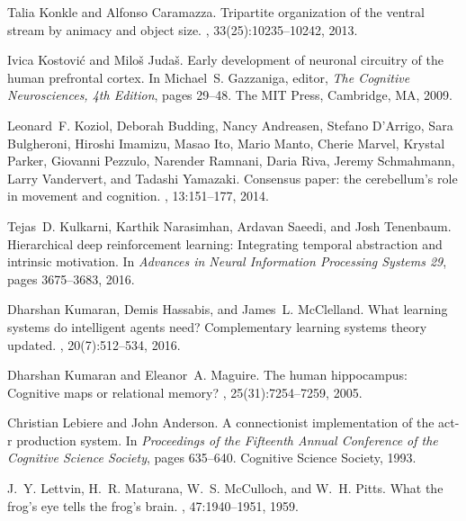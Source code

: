 \documentclass[letterpaper,11pt]{article}
\begin{document}
\begin{thebibliography}{100}
Talia Konkle and Alfonso Caramazza.
\newblock Tripartite organization of the ventral stream by animacy and object
  size.
, 33(25):10235--10242, 2013.

Ivica Kostovi\'{c} and Milo\v{s} Juda\v{s}.
\newblock Early development of neuronal circuitry of the human prefrontal
  cortex.
\newblock In Michael~S. Gazzaniga, editor, {\em The Cognitive Neurosciences,
  4th Edition}, pages 29--48. The MIT Press, Cambridge, MA, 2009.

Leonard~F. Koziol, Deborah Budding, Nancy Andreasen, Stefano D'Arrigo, Sara
  Bulgheroni, Hiroshi Imamizu, Masao Ito, Mario Manto, Cherie Marvel, Krystal
  Parker, Giovanni Pezzulo, Narender Ramnani, Daria Riva, Jeremy Schmahmann,
  Larry Vandervert, and Tadashi Yamazaki.
\newblock Consensus paper: the cerebellum's role in movement and cognition.
, 13:151--177, 2014.

Tejas~D. Kulkarni, Karthik Narasimhan, Ardavan Saeedi, and Josh Tenenbaum.
\newblock Hierarchical deep reinforcement learning: Integrating temporal
  abstraction and intrinsic motivation.
\newblock In {\em Advances in Neural Information Processing Systems 29}, pages
  3675--3683, 2016.

Dharshan Kumaran, Demis Hassabis, and James~L. McClelland.
\newblock What learning systems do intelligent agents need? {C}omplementary
  learning systems theory updated.
, 20(7):512--534, 2016.

Dharshan Kumaran and Eleanor~A. Maguire.
\newblock The human hippocampus: Cognitive maps or relational memory?
, 25(31):7254--7259, 2005.

Christian Lebiere and John Anderson.
\newblock A connectionist implementation of the act-r production system.
\newblock In {\em Proceedings of the Fifteenth Annual Conference of the
  Cognitive Science Society}, pages 635--640. Cognitive Science Society, 1993.

J.~Y. Lettvin, H.~R. Maturana, W.~S. McCulloch, and W.~H. Pitts.
\newblock What the frog's eye tells the frog's brain.
,
  47:1940--1951, 1959.


\end{thebibliography}
\end{document}
